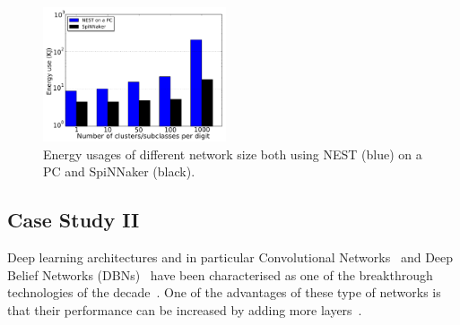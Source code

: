 \documentclass{frontiersENG} %
\begin{document}
\begin{table}[h]
\begin{center}
\begin{tabular} {l| c  c c c c c}
%			
		\end{tabular}
    \egroup
		\label{tbl:compare}
	\end{center}
\end{table}

\begin{figure}[hbt!]
	\centering
	\includegraphics[width=0.48\textwidth]{fig8}
	\caption{Energy usages of different network size both using NEST (blue) on a PC and SpiNNaker (black).}
	\label{fig:energy}
\end{figure}
\subsection{Case Study II}
Deep learning architectures and in particular Convolutional Networks~\citep{lecun1998gradient} and Deep Belief Networks (DBNs)~\citep{hinton2006fast} have been characterised as one of the breakthrough technologies of the decade~\citep{MIT_TechReview}. One of the advantages of these type of networks is that their performance can be increased by adding more layers~\citep{hinton2006fast}.
\end{document}
